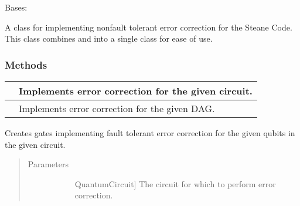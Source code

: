 \documentclass[letterpaper,10pt,english]{sphinxmanual}
\begin{document}

\begin{fulllineitems}
\label{\detokenize{Steane:Steane.SteaneErrorCorrector}}
Bases: {\hyperref[\detokenize{Base:BaseFaultTolerance.ErrorCorrector}]{}}

A class for implementing non\sphinxhyphen{}fault tolerant error correction for the Steane Code.
This class combines  and  into a single class for ease of use.
\subsubsection*{Methods}


\begin{savenotes}\sphinxattablestart
\centering
\begin{tabulary}{\linewidth}[t]{|T|T|}
\hline

&
Implements error correction for the given circuit.
\\
\hline
{}
&
Implements error correction for the given DAG.
\\
\hline
\end{tabulary}
\par
\sphinxattableend\end{savenotes}

\begin{fulllineitems}
\label{\detokenize{Steane:Steane.SteaneErrorCorrector.errorCorrectCircuit}}
Creates gates implementing fault tolerant error correction for the given qubits in the given circuit.
\begin{quote}\begin{description}
\item[{Parameters}] \leavevmode\begin{description}
\item[{}] \leavevmode{[}QuantumCircuit{]}
The circuit for which to perform error correction.


\end{description}
\end{description}
\end{quote}
\end{fulllineitems}
\end{fulllineitems}
\end{document}
